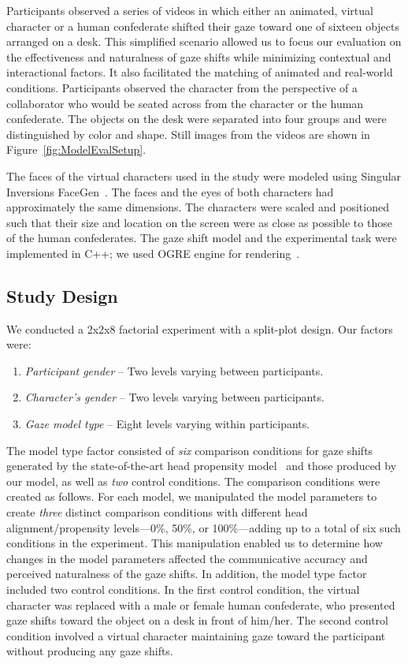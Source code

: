 Participants observed a series of videos in which either an animated, virtual character or a human confederate shifted their gaze toward one of sixteen objects arranged on a desk. This simplified scenario allowed us to focus our evaluation on the effectiveness and naturalness of gaze shifts while minimizing contextual and interactional factors. It also facilitated the matching of animated and real-world conditions. Participants observed the character from the perspective of a collaborator who would be seated across from the character or the human confederate. The objects on the desk were separated into four groups and were distinguished by color and shape. Still images from the videos are shown in Figure~\ref{fig:ModelEvalSetup}.

The faces of the virtual characters used in the study were modeled using Singular Inversions FaceGen~\citep{facegen}. The faces and the eyes of both characters had approximately the same dimensions. The characters were scaled and positioned such that their size and location on the screen were as close as possible to those of the human confederates. The gaze shift model and the experimental task were implemented in C++; we used OGRE engine for rendering~\citep{ogre3d}.

\subsection{Study Design}

We conducted a 2x2x8 factorial experiment with a split-plot design. Our factors were:

\begin{enumerate}
\item \emph{Participant gender} -- Two levels varying between participants.
\item \emph{Character's gender} -- Two levels varying between participants.
\item \emph{Gaze model type} -- Eight levels varying within participants.
\end{enumerate}

The model type factor consisted of \emph{six} comparison conditions for gaze shifts generated by the state-of-the-art head propensity model~\citep{peters2010animating} and those produced by our model, as well as \emph{two} control conditions. The comparison conditions were created as follows. For each model, we manipulated the model parameters to create \emph{three} distinct comparison conditions with different head alignment/propensity levels---0\%, 50\%, or 100\%---adding up to a total of six such conditions in the experiment. This manipulation enabled us to determine how changes in the model parameters affected the communicative accuracy and perceived naturalness of the gaze shifts. In addition, the model type factor included two control conditions. In the first control condition, the virtual character was replaced with a male or female human confederate, who presented gaze shifts toward the object on a desk in front of him/her. The second control condition involved a virtual character maintaining gaze toward the participant without producing any gaze shifts.

